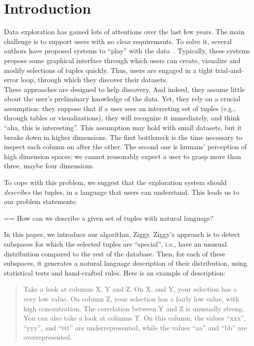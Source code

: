 \section{Introduction}
\label{sec:introdction}
Data exploration has gained lots of attentions over the last few years. The
main challenge is to support users with no clear requirements. To solve it,
several authors have proposed systems to ``play'' with the
data~\cite{abouzied2012dataplay, sellam2013meet, liarou2014dbtouch,
dimitriadou2014explore}. Typically, these systems propose some graphical
interface through which users can create, visualize and modify selections of
tuples quickly. Thus, users are engaged in a tight trial-and-error loop,
through which they discover their datasets.\\
These approaches are designed to help discovery. And indeed, they assume little
about the user's preliminary knowledge of the data. Yet, they rely on a crucial
assumption: they suppose that if a user sees an interesting set of tuples
(e.g., through tables or visualizations), they will recognize it immediately,
and think ``aha, this is interesting''. This assumption may hold with small
datasets, but it breaks down in higher dimensions. The first bottleneck is the
time necessary to inspect each column on after the other. The second one  is
humans' perception of high dimension spaces:  we cannot reasonably expect a
user to grasp more than three, maybe four dimensions. 

To cope with this problem, we suggest that the exploration system should
\emph{describes} the tuples, in a language that users can understand. This
leads us to our problem statements:
\begin{framed}
    \everypar={{=\lastbox}\everypar{}}
How can we describe a given set of tuples with natural language?
\end{framed}
In this paper, we introduce our algorithm, Ziggy. Ziggy's approach is to detect
subspaces for which the selected tuples are ``special'', i.e., have an unusual
distribution compared to the rest of the database. Then, for each of these
subspaces, it generates a natural language description of their distribution,
using statistical tests and hand-crafted rules. Here is an example of
description:
\begin{quote}
    Take a look at columns X, Y and Z. On X, and Y, your selection has a very
    low value. On column Z, your selection has a fairly low value, with high
    concentration. The correlation between Y and Z is unusually strong.\\
    You can also take a look at columns T. On this column, the
    values ``xxx'', ``yyy'', and ``ttt'' are underrepresented, while the values
    ``aa'' and ``bb'' are overrepresented.
\end{quote}

